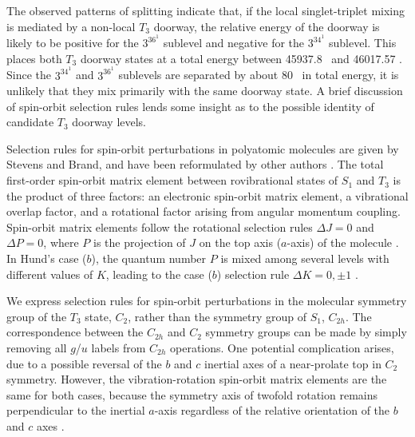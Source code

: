 \documentclass[12pt]{mitthesis}
\begin{document}
The observed patterns of splitting indicate that, if the local
singlet-triplet mixing is mediated by a non-local $T_3$ doorway, the
relative energy of the doorway is likely to be positive for the
$3^36^1$  sublevel and negative for the $3^34^1$ 
sublevel.  This places both $T_3$ doorway states at a total energy
between 45937.8 \rcm\ and 46017.57 \rcm.  Since the $3^34^1$ 
and $3^36^1$  sublevels are separated by about 80 \rcm\ in total
energy, it is unlikely that they mix primarily with the same doorway
state.  A brief discussion of spin-orbit selection rules lends some
insight as to the possible identity of candidate $T_3$ doorway levels.



Selection rules for spin-orbit perturbations in polyatomic molecules
are given by Stevens and Brand, and have been reformulated by other
authors \cite{stevens73, howard78, dupre84}.  The total first-order
spin-orbit matrix element between rovibrational states of $S_1$ and
$T_3$ is the product of three factors: an electronic spin-orbit matrix
element, a vibrational overlap factor, and a rotational factor arising
from angular momentum coupling.  Spin-orbit matrix elements follow the
rotational selection rules $\Delta J = 0$ and $\Delta P = 0$, where
$P$ is the projection of $J$ on the top axis ($a$-axis) of the
molecule \cite{hougen64}.  In Hund's case ($b$), the quantum number
$P$ is mixed among several levels with different values of $K$,
leading to the case ($b$) selection rule $\Delta K = 0, \pm 1$
\cite{hougen64, stevens73}.

We express selection rules for spin-orbit perturbations in the
molecular symmetry group of the $T_3$ state, $C_2$, rather than the
symmetry group of $S_1$, $C_{2h}$.  The correspondence between the
$C_{2h}$ and $C_{2}$ symmetry groups can be made by simply removing
all $g$/$u$ labels from $C_{2h}$ operations.  One potential
complication arises, due to a possible reversal of the $b$ and $c$
inertial axes of a near-prolate top in $C_2$ symmetry.  However, the
vibration-rotation spin-orbit matrix elements are the same for both
cases, because the symmetry axis of twofold rotation remains
perpendicular to the inertial $a$-axis regardless of the relative
orientation of the $b$ and $c$ axes \cite{hougen64}.
\end{document}
